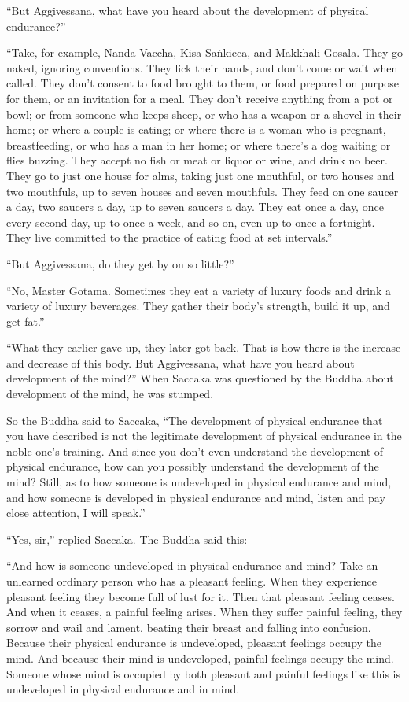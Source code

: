 \documentclass[12pt,openany]{book}%
\begin{document}
“But Aggivessana, what have you heard about the development of physical endurance?” 

“Take, for example, Nanda Vaccha, Kisa \textsanskrit{Saṅkicca}, and Makkhali \textsanskrit{Gosāla}. They go naked, ignoring conventions. They lick their hands, and don’t come or wait when called. They don’t consent to food brought to them, or food prepared on purpose for them, or an invitation for a meal. They don’t receive anything from a pot or bowl; or from someone who keeps sheep, or who has a weapon or a shovel in their home; or where a couple is eating; or where there is a woman who is pregnant, breastfeeding, or who has a man in her home; or where there’s a dog waiting or flies buzzing. They accept no fish or meat or liquor or wine, and drink no beer. They go to just one house for alms, taking just one mouthful, or two houses and two mouthfuls, up to seven houses and seven mouthfuls. They feed on one saucer a day, two saucers a day, up to seven saucers a day. They eat once a day, once every second day, up to once a week, and so on, even up to once a fortnight. They live committed to the practice of eating food at set intervals.” 

“But Aggivessana, do they get by on so little?” 

“No, Master Gotama. Sometimes they eat a variety of luxury foods and drink a variety of luxury beverages. They gather their body’s strength, build it up, and get fat.” 

“What they earlier gave up, they later got back. That is how there is the increase and decrease of this body. But Aggivessana, what have you heard about development of the mind?” When Saccaka was questioned by the Buddha about development of the mind, he was stumped. 

So the Buddha said to Saccaka, “The development of physical endurance that you have described is not the legitimate development of physical endurance in the noble one’s training. And since you don’t even understand the development of physical endurance, how can you possibly understand the development of the mind? Still, as to how someone is undeveloped in physical endurance and mind, and how someone is developed in physical endurance and mind, listen and pay close attention, I will speak.” 

“Yes, sir,” replied Saccaka. The Buddha said this: 

“And how is someone undeveloped in physical endurance and mind? Take an unlearned ordinary person who has a pleasant feeling. When they experience pleasant feeling they become full of lust for it. Then that pleasant feeling ceases. And when it ceases, a painful feeling arises. When they suffer painful feeling, they sorrow and wail and lament, beating their breast and falling into confusion. Because their physical endurance is undeveloped, pleasant feelings occupy the mind. And because their mind is undeveloped, painful feelings occupy the mind. Someone whose mind is occupied by both pleasant and painful feelings like this is undeveloped in physical endurance and in mind. 
\end{document}
